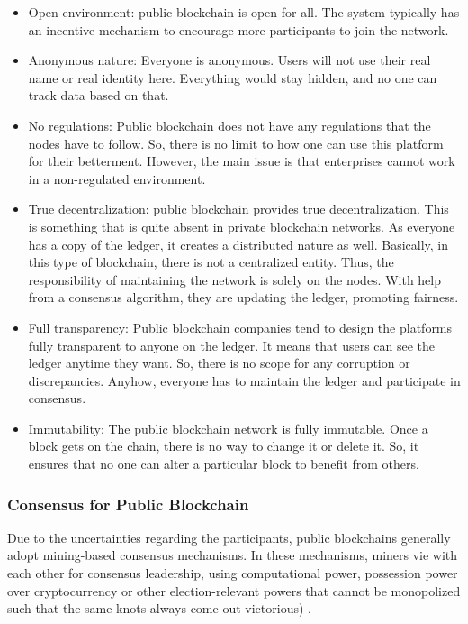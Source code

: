 \begin{itemize}
\item Open environment: public blockchain is open for all. The system typically has an incentive mechanism to encourage more participants to join the network.
\item Anonymous nature: Everyone is anonymous. Users will not use their real name or real identity here. Everything would stay hidden, and no one can track data based on that.
\item No regulations: Public blockchain does not have any regulations that the nodes have to follow. So, there is no limit to how one can use this platform for their betterment. However, the main issue is that enterprises cannot work in a non-regulated environment.
\item True decentralization: public blockchain provides true decentralization. This is something that is quite absent in private blockchain networks. As everyone has a copy of the ledger, it creates a distributed nature as well. Basically, in this type of blockchain, there is not a centralized entity. Thus, the responsibility of maintaining the network is solely on the nodes. With help from a consensus algorithm, they are updating the ledger, promoting fairness.
\item Full transparency: Public blockchain companies tend to design the platforms fully transparent to anyone on the ledger. It means that users can see the ledger anytime they want. So, there is no scope for any corruption or discrepancies. Anyhow, everyone has to maintain the ledger and participate in consensus.
\item Immutability: The public blockchain network is fully immutable. Once a block gets on the chain, there is no way to change it or delete it. So, it ensures that no one can alter a particular block to benefit from others.
\end{itemize}

\subsubsection{Consensus for Public Blockchain}\label{sec:consensoPublica}
Due to the uncertainties regarding the participants, public blockchains generally adopt mining-based consensus mechanisms. In these mechanisms, miners vie with each other for consensus leadership, using computational power, possession power over cryptocurrency or other election-relevant powers that cannot be monopolized such that the same knots always come out victorious) \cite{greve2018blockchain}.

